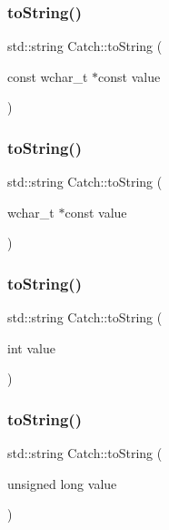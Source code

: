 \subsubsection{\texorpdfstring{to\+String()}{toString()}\hspace{0.1cm}{\footnotesize\ttfamily [6/17]}}
{\footnotesize\ttfamily std\+::string Catch\+::to\+String (\begin{DoxyParamCaption}\item[{const wchar\+\_\+t $\ast$const}]{value }\end{DoxyParamCaption})}

\hypertarget{namespace_catch_aa39121565abe9f30fce5d48e4e094768}{}\label{namespace_catch_aa39121565abe9f30fce5d48e4e094768} 
\subsubsection{\texorpdfstring{to\+String()}{toString()}\hspace{0.1cm}{\footnotesize\ttfamily [7/17]}}
{\footnotesize\ttfamily std\+::string Catch\+::to\+String (\begin{DoxyParamCaption}\item[{wchar\+\_\+t $\ast$const}]{value }\end{DoxyParamCaption})}

\hypertarget{namespace_catch_acee54d0580385e4347bc42a7d22bc893}{}\label{namespace_catch_acee54d0580385e4347bc42a7d22bc893} 
\subsubsection{\texorpdfstring{to\+String()}{toString()}\hspace{0.1cm}{\footnotesize\ttfamily [8/17]}}
{\footnotesize\ttfamily std\+::string Catch\+::to\+String (\begin{DoxyParamCaption}\item[{int}]{value }\end{DoxyParamCaption})}

\hypertarget{namespace_catch_aba1d78bce62f8c73cbfc2a14225356ea}{}\label{namespace_catch_aba1d78bce62f8c73cbfc2a14225356ea} 
\subsubsection{\texorpdfstring{to\+String()}{toString()}\hspace{0.1cm}{\footnotesize\ttfamily [9/17]}}
{\footnotesize\ttfamily std\+::string Catch\+::to\+String (\begin{DoxyParamCaption}\item[{unsigned long}]{value }\end{DoxyParamCaption})}

